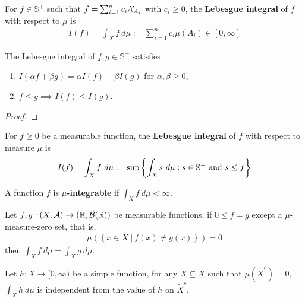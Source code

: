 \documentclass[11pt]{article}
\begin{document}
	
	\begin{definition}
		For $f \in \mathbb{S}^+$ such that $f = \sum_{i=1}^n c_i \mathcal{{X}}_{A_i}$ with $c_i \geq 0$, the \textbf{Lebesgue integral} of $f$ with respect to $\mu$ is
		\begin{align}
			I(f) = \int_X f\ d\mu := \sum_{i=1}^n c_i \mu(A_i) \in [0, \infty]
		\end{align}
	\end{definition}
	
	\begin{theorem}
		The Lebesgue integral of $f, g \in \mathbb{S}^+$ satisfies
		\begin{enumerate}
			\item $I(\alpha f + \beta g) = \alpha I(f) + \beta I(g)$ for $\alpha, \beta \geq 0$,
			\item $f \leq g \implies I(f) \leq I(g)$.
		\end{enumerate}
	\end{theorem}
	
	\begin{proof}
		
	\end{proof}
	
	\begin{definition}
		For $f \geq 0$ be a measurable function, the \textbf{Lebesgue integral} of $f$ with respect to measure $\mu$ is
		\begin{align}
			I(f) = \int_X f\ d\mu := \sup\left\{\int_X s\ d\mu: s \in \mathbb{S}^+ \text{{ and }} s \leq f \right\}
		\end{align}
	\end{definition}
	
	\begin{definition}
		A function $f$ is \textbf{$\mu$-integrable} if $\int_X f\ d\mu < \infty$.
	\end{definition}
	
	\begin{theorem}\label{thm:1}
		Let $f, g: (X, \mathcal{{A}}) \to (\mathbb{R}, \mathcal{{B}}(\mathbb{R}))$ be measurable functions, if $0 \leq f = g$ except a $\mu$-measure-zero set, that is,
		\begin{align}
			\mu\left(\left\{
				x \in X\ |\ f(x) \neq g(x)
			\right\}\right) = 0
		\end{align}
		then $\int_X f\ d\mu = \int_X g\ d\mu$.
	\end{theorem}
	
	\begin{lemma}\label{lem:1}
		Let $h: X \to [0, \infty)$ be a simple function, for any $\tilde{X} \subseteq X$ such that $\mu(\tilde{X}^c) = 0$, $\int_X h\ d\mu$ is independent from the value of $h$ on $\tilde{X}^c$.
	\end{lemma}
	
\end{document}
